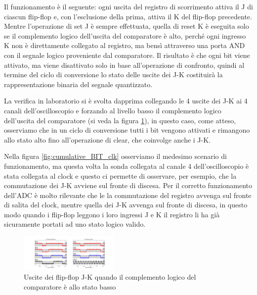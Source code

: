 \documentclass[journal]{IEEEtran}
\begin{document}
Il funzionamento è il seguente: ogni uscita del registro di scorrimento attiva il J di ciascun flip-flop e, con l'esclusione della prima, attiva il K del flip-flop precedente. Mentre l'operazione di set J è sempre effettuata, quella di reset K è eseguita solo se il complemento logico dell'uscita del comparatore è alto, perché ogni ingresso K non è direttamente collegato al registro, ma bensì attraverso una porta AND con il segnale logico proveniente dal comparatore. Il risultato è che ogni bit viene attivato, ma viene disattivato solo in base all'operazione di confronto, quindi al termine del ciclo di conversione lo stato delle uscite dei J-K costituirà la rappresentazione binaria del segnale quantizzato. 

La verifica in laboratorio si è svolta dapprima collegando le 4 uscite dei J-K ai 4 canali dell'oscilloscopio e forzando al livello basso il complemento logico dell'uscita del comparatore (si veda la figura \ref{fig:cumulative_BIT}), in questo caso, come atteso, osserviamo che in un ciclo di conversione tutti i bit vengono attivati e rimangono allo stato alto fino all'operazione di clear, che coinvolge anche i J-K.

Nella figura \ref{fig:cumulative_BIT_clk} osserviamo il medesimo scenario di funzionamento, ma questa volta la sonda collegata al canale 4 dell'oscilloscopio è stata collegata al clock e questo ci permette di osservare, per esempio, che la commutazione dei J-K avviene sul fronte di discesa. Per il corretto funzionamento dell'ADC è molto rilevante che le la commutazione del registro avvenga sul fronte di salita del clock, mentre quella dei J-K avvenga sul fronte di discesa, in questo modo quando i flip-flop leggono i loro ingressi J e K il registro li ha già sicuramente portati ad uno stato logico valido.

\begin{figure}[H]%
\begin{center}
\includegraphics[trim = {100 0 550 0}, clip, width=0.43\textwidth]{analysis/output/cumulative_BIT.pdf}
\caption{Uscite dei flip-flop J-K quando il complemento logico del comparatore è allo stato basso}
\label{fig:cumulative_BIT}
\end{center}
\end{figure}
\end{document}
